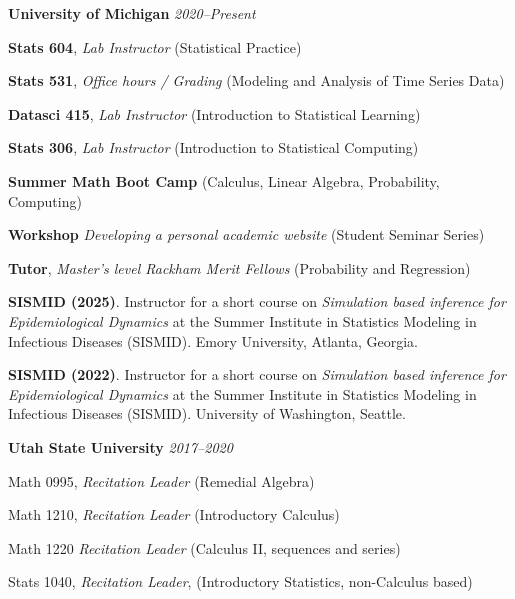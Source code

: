 \documentclass[11pt]{article}
\newenvironment {teachinglsit}
                {
                 \begin{list}{}
                 {\setlength{\labelwidth}{0mm}
                  \setlength{\leftmargin}{5mm}
                  \setlength{\labelsep}{0mm}
                  \setlength{\parsep}{0.1 ex}
                  \setlength{\itemsep}{1pt}
      \setlength{\topsep}{0.15cm}}} %
   {\end{list}}
\begin{document}
\noindent \textbf{University of Michigan} \hfill  {\textit{2020--Present}}

\begin{teachinglsit}
    \item \textbf{Stats 604}, {\it Lab Instructor} \hfill (Statistical Practice)
    \item \textbf{Stats 531}, {\it Office hours / Grading} \hfill (Modeling and Analysis of Time Series Data)
    \item \textbf{Datasci 415}, {\it Lab Instructor} \hfill (Introduction to Statistical Learning)
    \item \textbf{Stats 306}, {\it Lab Instructor} \hfill (Introduction to Statistical Computing)
    \item \textbf{Summer Math Boot Camp} \hfill (Calculus, Linear Algebra, Probability, Computing)
    \item \textbf{Workshop} {\it Developing a personal academic website} \hfill (Student Seminar Series)
    \item \textbf{Tutor}, {\it Master's level Rackham Merit Fellows} \hfill (Probability and Regression)

\end{teachinglsit}

\vspace{2mm}
\noindent \textbf{SISMID (2025)}. Instructor for a short course on {\it Simulation based inference for Epidemiological Dynamics} at the Summer Institute in Statistics Modeling in Infectious Diseases (SISMID). Emory University, Atlanta, Georgia.

\vspace{2mm}
\noindent \textbf{SISMID (2022)}. Instructor for a short course on {\it Simulation based inference for Epidemiological Dynamics} at the Summer Institute in Statistics Modeling in Infectious Diseases (SISMID). University of Washington, Seattle.

\vspace{2mm}
\noindent \textbf{Utah State University} \hfill  {\textit{2017--2020}}

\begin{teachinglsit}
    \item Math 0995, {\it Recitation Leader} (Remedial Algebra)
    \item Math 1210, {\it Recitation Leader} (Introductory Calculus)
    \item Math 1220 {\it Recitation Leader} (Calculus II, sequences and series)
    \item Stats 1040, {\it Recitation Leader}, (Introductory Statistics, non-Calculus based)
\end{teachinglsit}
\end{document}
